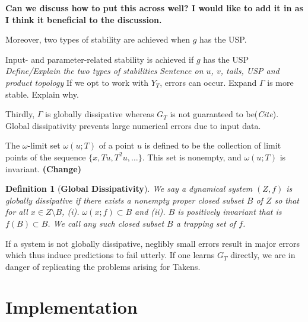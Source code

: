 \documentclass[a4paper,12pt,twoside]{book}
\newtheorem{Definition}{Definition}[]
\begin{document}
\textbf{Can we discuss how to put this across well? I would like to add it in as I think it beneficial to the discussion.}

Moreover, two types of stability are achieved when $g$ has the USP. 


Input- and parameter-related stability is achieved if $g$ has the USP
\newline \emph{Define/Explain the two types of stabilities}
\newline \emph{Sentence on $u$, $v$, tails, USP and product topology}
\newline If we opt to work with $Y_T$, errors can occur. Expand
\newline $\Gamma$ is more stable. Explain why.

Thirdly, $\Gamma$ is globally dissipative whereas $G_T$ is not guaranteed to be(\emph{Cite}).  Global dissipativity prevents large numerical errors due to input data.

The $\omega$-limit set $\omega(u;T)$ of a point $u$ is defined to be the collection of limit points of the sequence $\{x,Tu,T^2u,\ldots\}$. This set is nonempty, and $\omega(u;T)$ is invariant. \textbf{(Change)}

\begin{Definition}
  [\bf Global Dissipativity]\label{Dfn_GlobalDiss}
	We say a dynamical system $(Z,f)$ is globally dissipative if there exists a nonempty proper closed subset $B$ of $Z$  so that for all $x\in Z\setminus B$, (i). $\omega(x;f) \subset B$  and (ii).  $B$ is positively invariant that is $f(B) \subset B$. We call any such closed subset $B$ a trapping set of $f$. 
\end{Definition}

If a system is not globally dissipative, neglibly small errors result in major errors which thus induce predictions to fail utterly. If one learns $G_T$ directly, we are in danger of replicating the problems arising for Takens. 






\chapter{Implementation} \label{sect5}
 
 



\vspace{-1cm}


\end{document}
